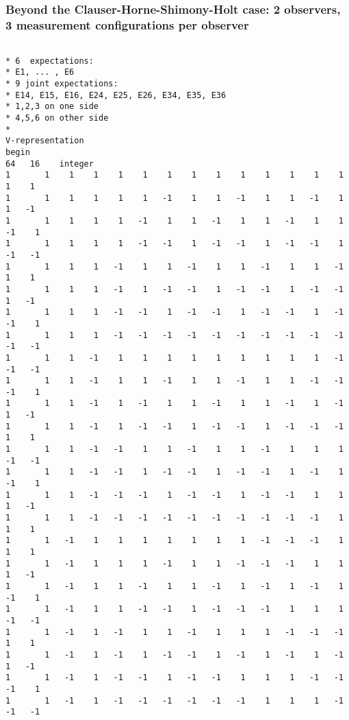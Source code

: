 \documentclass[%
 showpacs,
 showkeys,
 preprintnumbers,
 amsmath,amssymb,
 aps,
  pra,
  longbibliography,
 floatfix,
 ]{revtex4-1}
\begin{document}
\subsubsection{Beyond the Clauser-Horne-Shimony-Holt case: 2 observers, 3 measurement configurations per observer}
\label{2017-b-chshc1ba}

{ \begin{lstlisting}[backgroundcolor=\color{yellow!10},framerule=0pt,breaklines=true, frame=tb]

* 6  expectations:
* E1, ... , E6
* 9 joint expectations:
* E14, E15, E16, E24, E25, E26, E34, E35, E36
* 1,2,3 on one side
* 4,5,6 on other side
*
V-representation
begin
64   16    integer
1       1    1    1    1    1    1    1    1    1    1    1    1    1    1    1
1       1    1    1    1    1   -1    1    1   -1    1    1   -1    1    1   -1
1       1    1    1    1   -1    1    1   -1    1    1   -1    1    1   -1    1
1       1    1    1    1   -1   -1    1   -1   -1    1   -1   -1    1   -1   -1
1       1    1    1   -1    1    1   -1    1    1   -1    1    1   -1    1    1
1       1    1    1   -1    1   -1   -1    1   -1   -1    1   -1   -1    1   -1
1       1    1    1   -1   -1    1   -1   -1    1   -1   -1    1   -1   -1    1
1       1    1    1   -1   -1   -1   -1   -1   -1   -1   -1   -1   -1   -1   -1
1       1    1   -1    1    1    1    1    1    1    1    1    1   -1   -1   -1
1       1    1   -1    1    1   -1    1    1   -1    1    1   -1   -1   -1    1
1       1    1   -1    1   -1    1    1   -1    1    1   -1    1   -1    1   -1
1       1    1   -1    1   -1   -1    1   -1   -1    1   -1   -1   -1    1    1
1       1    1   -1   -1    1    1   -1    1    1   -1    1    1    1   -1   -1
1       1    1   -1   -1    1   -1   -1    1   -1   -1    1   -1    1   -1    1
1       1    1   -1   -1   -1    1   -1   -1    1   -1   -1    1    1    1   -1
1       1    1   -1   -1   -1   -1   -1   -1   -1   -1   -1   -1    1    1    1
1       1   -1    1    1    1    1    1    1    1   -1   -1   -1    1    1    1
1       1   -1    1    1    1   -1    1    1   -1   -1   -1    1    1    1   -1
1       1   -1    1    1   -1    1    1   -1    1   -1    1   -1    1   -1    1
1       1   -1    1    1   -1   -1    1   -1   -1   -1    1    1    1   -1   -1
1       1   -1    1   -1    1    1   -1    1    1    1   -1   -1   -1    1    1
1       1   -1    1   -1    1   -1   -1    1   -1    1   -1    1   -1    1   -1
1       1   -1    1   -1   -1    1   -1   -1    1    1    1   -1   -1   -1    1
1       1   -1    1   -1   -1   -1   -1   -1   -1    1    1    1   -1   -1   -1

\end{lstlisting}}
\end{document}
